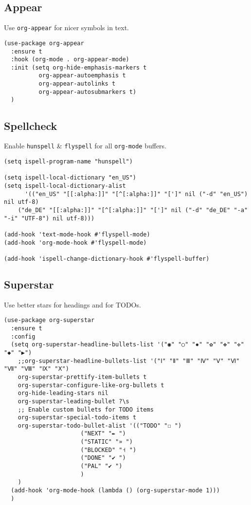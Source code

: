 \documentclass[11pt]{article}
\begin{document}
\subsection{Appear}
\label{sec:orgda314ef}
Use \texttt{org-appear} for nicer symbols in text.
\begin{verbatim}
(use-package org-appear
  :ensure t
  :hook (org-mode . org-appear-mode)
  :init (setq org-hide-emphasis-markers t
	      org-appear-autoemphasis t
	      org-appear-autolinks t
	      org-appear-autosubmarkers t)
  )
\end{verbatim}
\subsection{Spellcheck}
\label{sec:orgf652e67}
Enable \texttt{hunspell} \& \texttt{flyspell} for all \texttt{org-mode} buffers.
\begin{verbatim}
(setq ispell-program-name "hunspell")

(setq ispell-local-dictionary "en_US")
(setq ispell-local-dictionary-alist
      '(("en_US" "[[:alpha:]]" "[^[:alpha:]]" "[']" nil ("-d" "en_US") nil utf-8)
	("de_DE" "[[:alpha:]]" "[^[:alpha:]]" "[']" nil ("-d" "de_DE" "-a" "-i" "UTF-8") nil utf-8)))

(add-hook 'text-mode-hook #'flyspell-mode)
(add-hook 'org-mode-hook #'flyspell-mode)

(add-hook 'ispell-change-dictionary-hook #'flyspell-buffer)
\end{verbatim}
\subsection{Superstar}
\label{sec:orgd5f8cc1}
Use better stars for headings and for TODOs.
\begin{verbatim}
(use-package org-superstar
  :ensure t
  :config
  (setq org-superstar-headline-bullets-list '("◉" "○" "✸" "✿" "✤" "✜" "◆" "▶")
	;;org-superstar-headline-bullets-list '("Ⅰ" "Ⅱ" "Ⅲ" "Ⅳ" "Ⅴ" "Ⅵ" "Ⅶ" "Ⅷ" "Ⅸ" "Ⅹ")
	org-superstar-prettify-item-bullets t
	org-superstar-configure-like-org-bullets t
	org-hide-leading-stars nil
	org-superstar-leading-bullet ?\s
	;; Enable custom bullets for TODO items
	org-superstar-special-todo-items t
	org-superstar-todo-bullet-alist '(("TODO" "☐ ")
					  ("NEXT" "✒ ")
					  ("STATIC" "» ")
					  ("BLOCKED" "˧ ")
					  ("DONE" "✔ ")
					  ("PAL" "✔ ")
					  )
	)
  (add-hook 'org-mode-hook (lambda () (org-superstar-mode 1)))
  )

\end{verbatim}
\end{document}
